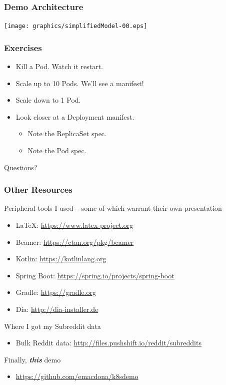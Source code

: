     \begin{frame}
        \frametitle{Demo Architecture}
        \texttt{[image: graphics/simplifiedModel-00.eps]}
    \end{frame}

    \begin{frame}
        \frametitle{Exercises}
        \begin{itemize}
            \item{Kill a Pod. Watch it restart.}
            \item{Scale up to 10 Pods. We'll see a manifest!}
            \item{Scale down to 1 Pod.}
            \item{Look closer at a Deployment manifest.}
            \begin{itemize}
                \item{Note the ReplicaSet spec.}
                \item{Note the Pod spec.}
            \end{itemize}
        \end{itemize}
    \end{frame}

    \begin{frame}
        \begin{center}
            \Huge Questions?
        \end{center}
    \end{frame}

    \begin{frame}
        \frametitle{Other Resources}
        Peripheral tools I used -- some of which warrant their own presentation
        \begin{itemize}
            \item \LaTeX: \href{https://www.latex-project.org}{https://www.latex-project.org}
            \item Beamer: \href{https://ctan.org/pkg/beamer}{https://ctan.org/pkg/beamer}
            \item Kotlin: \href{https://kotlinlang.org}{https://kotlinlang.org}
            \item Spring Boot: \href{https://spring.io/projects/spring-boot}{https://spring.io/projects/spring-boot}
            \item Gradle: \href{https://gradle.org}{https://gradle.org}
            \item Dia: \href{http://dia-installer.de}{http://dia-installer.de}
        \end{itemize}
        \smallskip
        Where I got my Subreddit data
        \begin{itemize}
            \item Bulk Reddit data: \href{http://files.pushshift.io/reddit/subreddits}{http://files.pushshift.io/reddit/subreddits}
        \end{itemize}
        Finally, \textbf{\textit{this}} demo
        \begin{itemize}
            \item \href{https://github.com/emacdona/k8sdemo}{https://github.com/emacdona/k8sdemo}
        \end{itemize}
    \end{frame}

